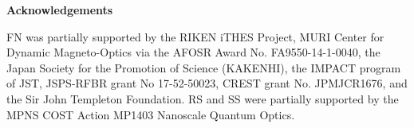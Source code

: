 \documentclass[journal=apchd5,manuscript=article]{achemso}
\begin{document}
%
%
%
%
%
%
%
%
%
%
%
%
%
%
%
%
%
%
\newpage
\noindent
{\Large \bf Acknowledgements}

FN was partially supported by the RIKEN iTHES Project,
MURI Center for Dynamic Magneto-Optics via the AFOSR Award No. FA9550-14-1-0040,
the Japan Society for the Promotion of Science (KAKENHI),
the IMPACT program of JST,
JSPS-RFBR grant No 17-52-50023,
CREST grant No. JPMJCR1676,
and the Sir John Templeton Foundation.
RS and SS were partially supported by the MPNS
COST Action MP1403 Nanoscale Quantum Optics.







%
\end{document}

